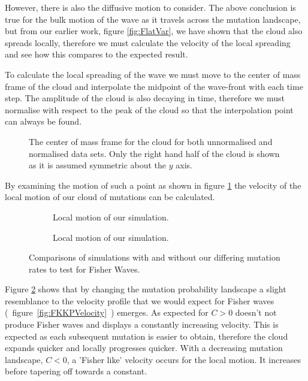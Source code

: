 \documentclass[12pt, a4paper,]{article}
\begin{document}
However, there is also the diffusive motion to consider. The above conclusion is true for the bulk motion of the wave as it travels across the mutation landscape, but from our earlier work, figure \ref{fig:FlatVar}, we have shown that the cloud also spreads locally, therefore we must calculate the velocity of the local spreading and see how this compares to the expected result. 

To calculate the local spreading of the wave we must move to the center of mass frame of the cloud and interpolate the midpoint of the wave-front with each time step. The amplitude of the cloud is also decaying in time, therefore we must normalise with respect to the peak of the cloud so that the interpolation point can always be found. 

\begin{figure}[H]
	\centering
	\begin{subfigure}[h] {0.5 \textwidth}
		
	\end{subfigure}%
	\begin{subfigure}[h] {0.5 \textwidth}
		
	\end{subfigure}
	\caption{The center of mass frame for the cloud for both unnormalised and normalised data sets. Only the right hand half of the cloud is shown as it is assumed symmetric about the $y$ axis.}
\label{fig:NormedCOM}
\end{figure}

By examining the motion of such a point as shown in figure \ref{fig:NormedCOM} the velocity of the local motion of our cloud of mutations can be calculated.  

\begin{figure}[H]
	\begin{subfigure}[h]{0.5 \textwidth}
		
		\caption{Local motion of our simulation.}
	\end{subfigure}
	\begin{subfigure}[h]{0.5 \textwidth}
		
		\caption{Local motion of our simulation.}
	\end{subfigure}
	\caption{Comparisons of simulations with and without our differing mutation rates to test for Fisher Waves.}
	\label{fig:LocalMotionCancer}
\end{figure}

Figure \ref{fig:LocalMotionCancer} shows that by changing the mutation probability landscape a slight resemblance to the velocity profile that we would expect for Fisher waves (~figure~\ref{fig:FKKPVelocity}~) emerges. 
As expected for $C>0$ doesn't not produce Fisher waves and displays a constantly increasing velocity. This is expected as each subsequent mutation is easier to obtain, therefore the cloud expands quicker and locally progresses quicker. With a decreasing mutation landscape, $C < 0$,  a 'Fisher like' velocity occurs for the local motion. It increases before tapering off towards a constant. 
\end{document}
